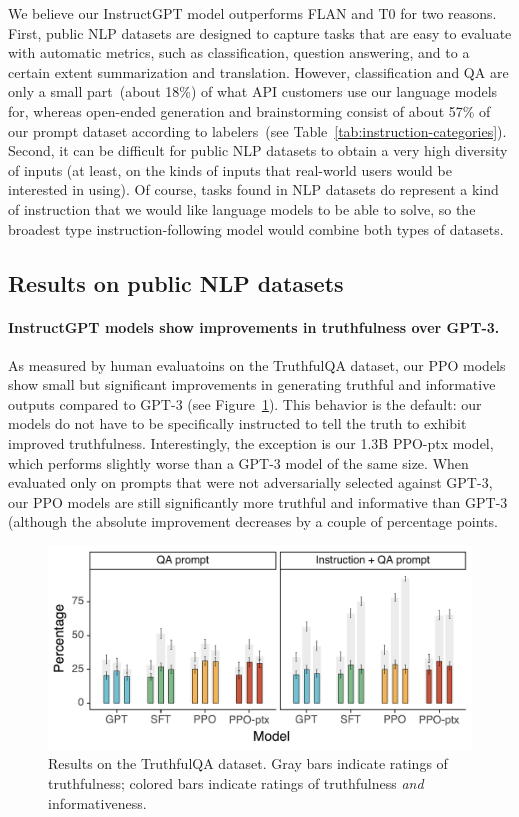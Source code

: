 \documentclass{article}
\begin{document}
We believe our InstructGPT model outperforms FLAN and T0 for two reasons. First, public NLP datasets are designed to capture tasks that are easy to evaluate with automatic metrics, such as classification, question answering, and to a certain extent summarization and translation. However, classification and QA are only a small part~(about 18\%) of what API customers use our language models for, whereas open-ended generation and brainstorming consist of about 57\% of our prompt dataset according to labelers~(see Table~\ref{tab:instruction-categories}). Second, it can be difficult for public NLP datasets to obtain a very high diversity of inputs (at least, on the kinds of inputs that real-world users would be interested in using).
Of course, tasks found in NLP datasets do represent a kind of instruction that we would like language models to be able to solve, so the broadest type instruction-following model would combine both types of datasets.


\subsection{Results on public NLP datasets}
\label{sec:results-public-nlp}

\paragraph{InstructGPT models show improvements in truthfulness over GPT-3.} As measured by human evaluatoins on the TruthfulQA dataset, our PPO models show small but significant improvements in generating truthful and informative outputs compared to GPT-3 (see Figure~\ref{fig:truthfulqa}). This behavior is the default: our models do not have to be specifically instructed to tell the truth to exhibit improved truthfulness. Interestingly, the exception is our 1.3B PPO-ptx model, which performs slightly worse than a GPT-3 model of the same size. When evaluated only on prompts that were not adversarially selected against GPT-3, our PPO models are still significantly more truthful and informative than GPT-3 (although the absolute improvement decreases by a couple of percentage points. 


\begin{figure}[ht]
    \centering
    \includegraphics[width=0.92\linewidth]{figs/tqa-twobars-human.pdf}
    \caption{Results on the TruthfulQA dataset. Gray bars indicate ratings of truthfulness; colored bars indicate ratings of truthfulness \textit{and} informativeness.}
    \label{fig:truthfulqa}
\end{figure}
\end{document}
